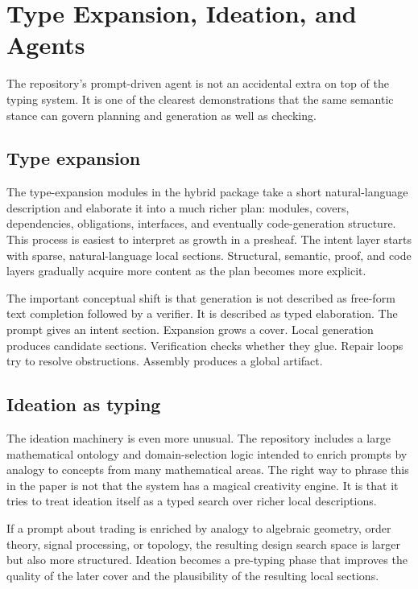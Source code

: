 \chapter{Type Expansion, Ideation, and Agents}

The repository's prompt-driven agent is not an accidental extra on top of the typing
system. It is one of the clearest demonstrations that the same semantic stance can govern
planning and generation as well as checking.

\section*{Type expansion}
The type-expansion modules in the hybrid package take a short natural-language description
and elaborate it into a much richer plan: modules, covers, dependencies, obligations,
interfaces, and eventually code-generation structure. This process is easiest to interpret
as growth in a presheaf. The intent layer starts with sparse, natural-language local
sections. Structural, semantic, proof, and code layers gradually acquire more content as
the plan becomes more explicit.

The important conceptual shift is that generation is not described as free-form text
completion followed by a verifier. It is described as typed elaboration. The prompt gives
an intent section. Expansion grows a cover. Local generation produces candidate sections.
Verification checks whether they glue. Repair loops try to resolve obstructions. Assembly
produces a global artifact.

\section*{Ideation as typing}
The ideation machinery is even more unusual. The repository includes a large mathematical
ontology and domain-selection logic intended to enrich prompts by analogy to concepts from
many mathematical areas. The right way to phrase this in the paper is not that the system
has a magical creativity engine. It is that it tries to treat ideation itself as a typed
search over richer local descriptions.

If a prompt about trading is enriched by analogy to algebraic geometry, order theory,
signal processing, or topology, the resulting design search space is larger but also more
structured. Ideation becomes a pre-typing phase that improves the quality of the later
cover and the plausibility of the resulting local sections.

